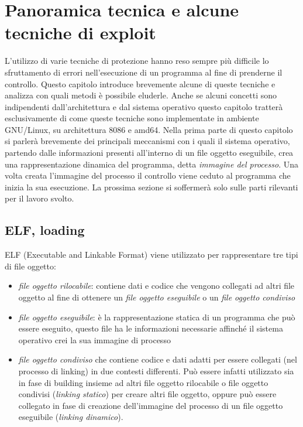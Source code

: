 \chapter{Panoramica tecnica e alcune tecniche di exploit}

L'utilizzo di varie tecniche di protezione hanno reso sempre più
difficile lo sfruttamento di errori nell'esecuzione di un programma al
fine di prenderne il controllo. Questo capitolo introduce brevemente
alcune di queste tecniche e analizza con quali metodi è possibile
eluderle. Anche se alcuni concetti sono indipendenti dall'architettura
e dal sistema operativo questo capitolo tratterà esclusivamente di come
queste tecniche sono implementate in ambiente GNU/Linux, su
architettura 8086 e amd64. Nella prima parte di questo capitolo si
parlerà brevemente dei principali meccanismi con i quali il sistema
operativo, partendo dalle informazioni presenti all'interno di un file
oggetto eseguibile, crea una rappresentazione dinamica del programma,
detta \emph{immagine del processo}. Una volta creata l'immagine del
processo il controllo viene ceduto al programma che inizia la sua
esecuzione. La prossima sezione si soffermerà solo sulle parti
rilevanti per il lavoro svolto.

\section{ELF, loading}

ELF (Executable and Linkable Format) viene utilizzato per 
rappresentare tre tipi di file oggetto:

\begin{itemize}
  \item \emph{file oggetto rilocabile}: contiene dati e codice che
    vengono collegati ad altri file oggetto al fine di ottenere un
    \emph{file oggetto eseguibile} o un \emph{file oggetto condiviso}

  \item \emph{file oggetto eseguibile}: è la rappresentazione statica
    di un programma che può essere eseguito, questo file ha le
    informazioni necessarie affinché il sistema operativo crei la sua
    immagine di processo

  \item \emph{file oggetto condiviso} che contiene codice e dati
    adatti per essere collegati (nel processo di linking) in due
    contesti differenti. Può essere infatti utilizzato sia in fase di
    building insieme ad altri file oggetto rilocabile o file oggetto
    condivisi (\emph{linking statico}) per creare altri file oggetto,
    oppure può essere collegato in fase di creazione dell'immagine del
    processo di un file oggetto eseguibile (\emph{linking dinamico}).

\end{itemize}

